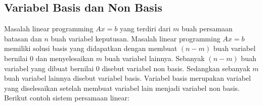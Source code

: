 	
		
		
		
		
		

\subsection{Variabel Basis dan Non Basis}
\label{variabel_basis_dan_non_basis}

Masalah linear programming \(Ax = b\) yang terdiri dari \(m\) buah persamaan batasan dan \(n\) buah variabel keputusan. Masalah linear programming \(Ax = b\) memiliki solusi basis yang didapatkan dengan membuat \((n - m)\) buah variabel bernilai 0 dan menyelesaikan \(m\) buah variabel lainnya. Sebanyak \((n - m)\) buah variabel yang dibuat bernilai 0 disebut variabel non basis. Sedangkan sebanyak \(m\) buah variabel lainnya disebut variabel basis. Variabel basis merupakan variabel yang diselesaikan setelah membuat variabel lain menjadi variabel non basis. Berikut contoh sistem persamaan linear:

